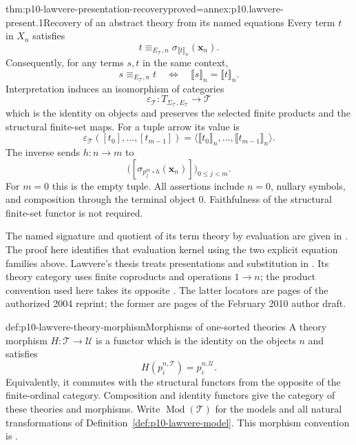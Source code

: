 \begin{hbtheorem}{thm:p10-lawvere-presentation-recovery}{proved=annex:p10.lawvere-present.1}{Recovery of an abstract theory from its named equations}
Every term \(t\) in \(X_n\) satisfies
\[
       t\equiv_{E_{\mathcal T},n}
                         \sigma_{\llbracket t\rrbracket_n}(\mathbf x_n).
\]
Consequently, for any terms \(s,t\) in the same context,
\[
 s\equiv_{E_{\mathcal T},n}t
       \quad\Longleftrightarrow\quad
                  \llbracket s\rrbracket_n=\llbracket t\rrbracket_n.
\]
Interpretation induces an isomorphism of categories
\[
 \varepsilon_{\mathcal T}:
       T_{\Sigma_{\mathcal T},E_{\mathcal T}}
                  \longrightarrow\mathcal T
\]
which is the identity on objects and preserves the selected
finite products and the structural finite-set maps.
For a tuple arrow its value is
\[
       \varepsilon_{\mathcal T}([t_0],\ldots,[t_{m-1}])
          =\langle\llbracket t_0\rrbracket_n,\ldots,
                                     \llbracket t_{m-1}\rrbracket_n\rangle.
\]
The inverse sends \(h:n\to m\) to
\[
       \bigl([\sigma_{p_j^m\circ h}(\mathbf x_n)]\bigr)_{0\leq j<m}.
\]
For \(m=0\) this is the empty tuple.
All assertions include \(n=0\), nullary symbols, and composition
through the terminal object \(0\).  Faithfulness of the structural
finite-set functor is not required.
\end{hbtheorem}

The named signature and quotient of its term theory by evaluation
are given in
\cite[Definition~13.5 and Proposition~13.7, p.~123;
Remark~13.8, p.~124]{AdamekRosickyVitale2010Draft}.
The proof here identifies that evaluation kernel using the two
explicit equation families above.
Lawvere's thesis treats presentations and substitution in
\cite[Chapter~II, \S2, pp.~69--73]{Lawvere2004FunctorialReprint}.
Its theory category uses finite coproducts and operations \(1\to n\);
the product convention used here takes its opposite
\cite[Chapter~II, \S1, pp.~61--63]{Lawvere2004FunctorialReprint}.
The latter locators are pages of the authorized 2004 reprint;
the former are pages of the February 2010 author draft.

\begin{hbdefinition}{def:p10-lawvere-theory-morphism}{Morphisms of one-sorted theories}
A theory morphism \(H:\mathcal T\to\mathcal U\) is a functor
which is the identity on the objects \(n\) and satisfies
\[
                         H(p_i^{n,\mathcal T})=p_i^{n,\mathcal U}.
\]
Equivalently, it commutes with the structural functors from the
opposite of the finite-ordinal category.
Composition and identity functors give the category of these
theories and morphisms.
Write \(\operatorname{Mod}(\mathcal T)\) for the models and all
natural transformations of Definition~\ref{def:p10-lawvere-model}.
This morphism convention is
\cite[Definition~11.3 and Remark~11.4, p.~98]{AdamekRosickyVitale2010Draft}.
\end{hbdefinition}

